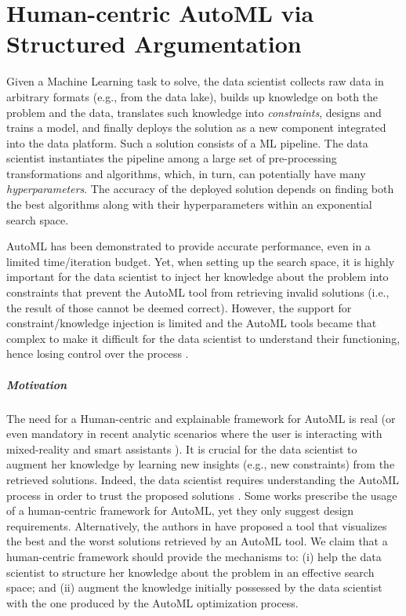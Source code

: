 \chapter{Human-centric AutoML via Structured Argumentation}
\label{human-centric-chap:hamlet}


Given a Machine Learning task to solve, the data scientist collects raw data in arbitrary formats (e.g., from the data lake), builds up knowledge on both the problem and the data, translates such knowledge into \emph{constraints}, designs and trains a model, and finally deploys the solution as a new component integrated into the data platform.
Such a solution consists of a ML pipeline.
The data scientist instantiates the pipeline among a large set of pre-processing transformations and algorithms, which, in turn, can potentially have many \emph{hyperparameters}.
The accuracy of the deployed solution depends on finding both the best algorithms along with their hyperparameters within an exponential search space.

AutoML has been demonstrated to provide accurate performance, even in a limited time/iteration budget.
Yet, when setting up the search space, it is highly important for the data scientist to inject her knowledge about the problem into constraints that prevent the AutoML tool from retrieving invalid solutions (i.e., the result of those cannot be deemed correct).
However, the support for constraint/knowledge injection is limited and the AutoML tools became that complex to make it difficult for the data scientist to understand their functioning, hence losing control over the process \cite{XinWLSP21automationml}.

\paragraph{Motivation}
The need for a Human-centric and explainable framework for AutoML is real \cite{gil2019towards, lee2020human, wang2019human} (or even mandatory in recent analytic scenarios where the user is interacting with mixed-reality and smart assistants \cite{DBLP:conf/dolap/FranciaGR19,DBLP:journals/is/FranciaGG22}).
It is crucial for the data scientist to augment her knowledge by learning new insights (e.g., new constraints) from the retrieved solutions.
Indeed, the data scientist requires understanding the AutoML process in order to trust the proposed solutions \cite{drozdal2020trust}.
Some works \cite{gil2019towards, lee2020human, wang2019human} prescribe the usage of a human-centric framework for AutoML, yet they only suggest design requirements.
Alternatively, the authors in \cite{ono2020pipelineprofiler} have proposed a tool that visualizes the best and the worst solutions retrieved by an AutoML tool.
We claim that a human-centric framework should provide the mechanisms to: (i) help the data scientist to structure her knowledge about the problem in an effective search space; and (ii) augment the knowledge initially possessed by the data scientist with the one produced by the AutoML optimization process.

